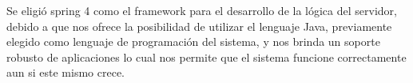 Se eligió spring 4 como el framework para el desarrollo de la lógica del servidor, debido a que nos ofrece la posibilidad de utilizar el lenguaje Java, previamente elegido como lenguaje de programación del sistema, y nos brinda un soporte robusto de aplicaciones lo cual nos permite que el sistema funcione correctamente aun si este mismo crece.